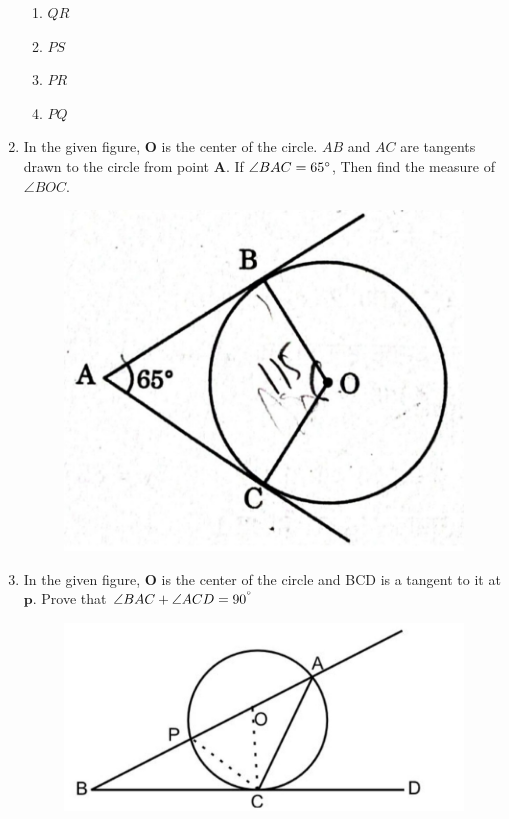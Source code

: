 \documentclass{article}
\let\vec\mathbf
\begin{document}
\begin{enumerate}
\begin{figure}[H]
			\caption{}
			\label{fig}
		\end{figure}
		\begin{enumerate}
			\item $ QR $
			\item $ PS $
			\item $ PR $
			\item $ PQ $
		\end{enumerate}
	\item In the given figure, $ \vec{O} $ is the center of the circle. $ AB $ and $ AC $ are tangents drawn 
		to the circle from point $ \vec{A} $. If $ \angle{BAC}=65{\degree} $, Then find the measure of 
		$ \angle{BOC} $.
		\begin{figure}[H]
			\centering
			\includegraphics[width=\columnwidth]{fig7.jpg}
			\caption{}
			\label{fig}
		\end{figure}
	\item In the given figure, $ \vec{O} $ is the center of the circle and BCD is a tangent to it at
		$ \vec{p} $. Prove that $ \angle{BAC}+\angle{ACD}=90^{\degree} $\\
		\begin{figure}[H]
              \centering          
        	\includegraphics[width=\columnwidth]{fig8.jpg}     

\end{figure}
\end{enumerate}
\end{document}
